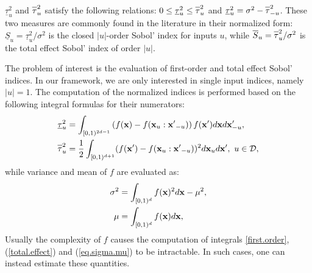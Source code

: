 $\underline{\tau}_u^2$ and $\ov{$\tau$}_u^2$ satisfy the following relations: $ 0 \leq  \underline{\tau}_u^2 \leq \ov{$\tau$}_u^2$ and $\underline{\tau}_u^2 = \sigma^2 - \ov{$\tau$}_{-u}^2$. These two measures are commonly found in the literature in their normalized form: $\underline{S}_u = \underline{\tau}_u^2 / \sigma^2$ is the closed $|u|$-order Sobol' index for inputs $u$, while $\ov{$S$}_u = \ov{$\tau$}_u^2 / \sigma^2$ is the total effect Sobol' index of order $|u|$.
\bigskip

The problem of interest is the evaluation of first-order and total effect Sobol' indices. In our framework, we are only interested in single input indices, namely $|u|=1$. The computation of the normalized indices is performed based on the following integral formulas for their numerators:
\begin{align}
\label{first.order}
\underline{\tau}_u^2  &= \int_{[0,1)^{2d-1}} \left(f(\vx)-
f(\vx_u:{\vx'}_{-u})\right)f(\vx')d\vx d{\vx'_{-u}}, \\
\label{total.effect}
\ov{$\tau$}_u^2 &= \frac{1}{2}\int_{[0,1)^{d+1}}(f(\vx')-f(\vx_u:{\vx'}_{-u}))^2 d\vx_u d{\vx'}, \ u \in \mathcal{D},
\end{align}
while variance and mean of $f$ are evaluated as:
\begin{gather}
\begin{aligned}
\sigma^2 &= \int_{[0,1)^{d}} f(\boldsymbol{\mathbf{x}})^2d{\boldsymbol{\mathbf{x}}} - \mu^2, \\
 \mu &= \int_{[0,1)^{d}} f(\boldsymbol{\mathbf{x}}) d{\boldsymbol{\mathbf{x}}},
\label{eq.sigma.mu}
\end{aligned}
\end{gather}
Usually the complexity of $f$ causes the computation of integrals \eqref{first.order}, (\ref{total.effect}) and (\ref{eq.sigma.mu}) to be intractable. In such cases, one can instead estimate these quantities.

